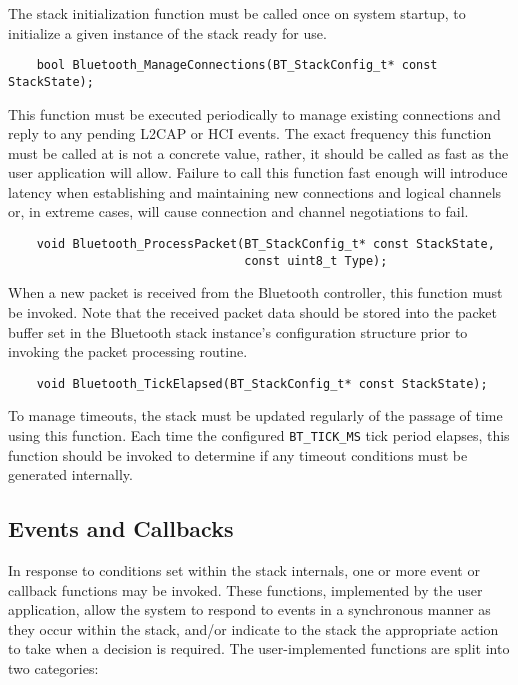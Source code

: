 The stack initialization function must be called once on system startup, to initialize a given instance of the stack ready for use.

\vspace{1em}
\begin{lstlisting}
	bool Bluetooth_ManageConnections(BT_StackConfig_t* const StackState);
\end{lstlisting}

This function must be executed periodically to manage existing connections and reply to any pending L2CAP or HCI events. The exact frequency this function must be called at is not a concrete value, rather, it should be called as fast as the user application will allow. Failure to call this function fast enough will introduce latency when establishing and maintaining new connections and logical channels or, in extreme cases, will cause connection and channel negotiations to fail.
	
\vspace{1em}
\begin{lstlisting}
	void Bluetooth_ProcessPacket(BT_StackConfig_t* const StackState,
	                             const uint8_t Type);
\end{lstlisting}

When a new packet is received from the Bluetooth controller, this function must be invoked. Note that the received packet data should be stored into the packet buffer set in the Bluetooth stack instance's configuration structure prior to invoking the packet processing routine.

\vspace{1em}
\begin{lstlisting}
	void Bluetooth_TickElapsed(BT_StackConfig_t* const StackState);
\end{lstlisting}

To manage timeouts, the stack must be updated regularly of the passage of time using this function. Each time the configured \lstinline{BT_TICK_MS} tick period elapses, this function should be invoked to determine if any timeout conditions must be generated internally.

\subsection{Events and Callbacks}

In response to conditions set within the stack internals, one or more event or callback functions may be invoked. These functions, implemented by the user application, allow the system to respond to events in a synchronous manner as they occur within the stack, and/or indicate to the stack the appropriate action to take when a decision is required. The user-implemented functions are split into two categories:

